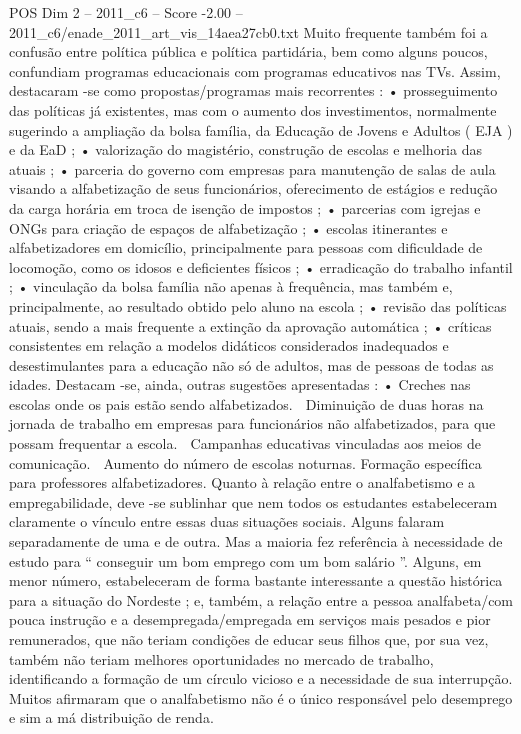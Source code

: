 \begin{textsample}{POS Dim 2 – 2011\_c6 – Score -2.00 – 2011\_c6/enade\_2011\_art\_vis\_14aea27cb0.txt}
Muito frequente também foi a confusão entre política pública e política partidária, bem como alguns poucos, confundiam programas educacionais com programas educativos nas TVs.
Assim, destacaram -se como propostas/programas mais recorrentes : • prosseguimento das políticas já existentes, mas com o aumento dos investimentos, normalmente sugerindo a ampliação da bolsa família, da Educação de Jovens e Adultos ( EJA ) e da EaD ; • valorização do magistério, construção de escolas e melhoria das atuais ; • parceria do governo com empresas para manutenção de salas de aula visando a alfabetização de seus funcionários, oferecimento de estágios e redução da carga horária em troca de isenção de impostos ; • parcerias com igrejas e ONGs para criação de espaços de alfabetização ; • escolas itinerantes e alfabetizadores em domicílio, principalmente para pessoas com dificuldade de locomoção, como os idosos e deficientes físicos ; • erradicação do trabalho infantil ; • vinculação da bolsa família não apenas à frequência, mas também e, principalmente, ao resultado obtido pelo aluno na escola ; • revisão das políticas atuais, sendo a mais frequente a extinção da aprovação automática ; • críticas consistentes em relação a modelos didáticos considerados inadequados e desestimulantes para a educação não só de adultos, mas de pessoas de todas as idades.
Destacam -se, ainda, outras sugestões apresentadas : • Creches nas escolas onde os pais estão sendo alfabetizados.  Diminuição de duas horas na jornada de trabalho em empresas para funcionários não alfabetizados, para que possam frequentar a escola.  Campanhas educativas vinculadas aos meios de comunicação.  Aumento do número de escolas noturnas.
Formação específica para professores alfabetizadores.
Quanto à relação entre o analfabetismo e a empregabilidade, deve -se sublinhar que nem todos os estudantes estabeleceram claramente o vínculo entre essas duas situações sociais.
Alguns falaram separadamente de uma e de outra.
Mas a maioria fez referência à necessidade de estudo para “ conseguir um bom emprego com um bom salário ”.
Alguns, em menor número, estabeleceram de forma bastante interessante a questão histórica para a situação do Nordeste ; e, também, a relação entre a pessoa analfabeta/com pouca instrução e a desempregada/empregada em serviços mais pesados e pior remunerados, que não teriam condições de educar seus filhos que, por sua vez, também não teriam melhores oportunidades no mercado de trabalho, identificando a formação de um círculo vicioso e a necessidade de sua interrupção.
Muitos afirmaram que o analfabetismo não é o único responsável pelo desemprego e sim a má distribuição de renda.

\end{textsample}
